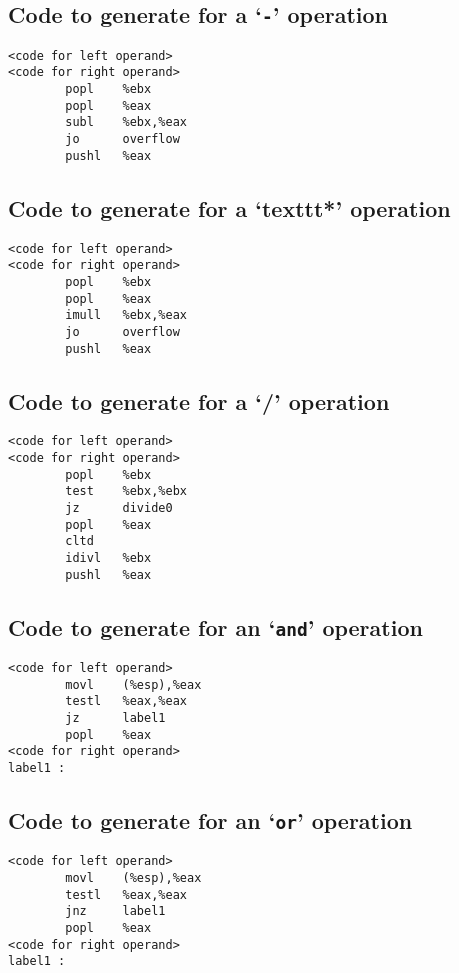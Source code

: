 \documentclass{article}
\begin{document}
\subsection*{Code to generate for a `\texttt{-}' operation}
\begin{verbatim}
<code for left operand>
<code for right operand>
        popl    %ebx
        popl    %eax
        subl    %ebx,%eax
        jo      overflow
        pushl   %eax
\end{verbatim}

\subsection*{Code to generate for a `texttt{*}' operation}
\begin{verbatim}
<code for left operand>
<code for right operand>
        popl    %ebx
        popl    %eax
        imull   %ebx,%eax
        jo      overflow
        pushl   %eax
\end{verbatim}

\subsection*{Code to generate for a `/' operation}
\begin{verbatim}
<code for left operand>
<code for right operand>
        popl    %ebx
        test    %ebx,%ebx
        jz      divide0
        popl    %eax
        cltd
        idivl   %ebx
        pushl   %eax
\end{verbatim}

\subsection*{Code to generate for an `\texttt{and}' operation}
\begin{verbatim}
<code for left operand>
        movl    (%esp),%eax
        testl   %eax,%eax
        jz      label1
        popl    %eax
<code for right operand>
label1 :
\end{verbatim}

\subsection*{Code to generate for an `\texttt{or}' operation}
\begin{verbatim}
<code for left operand>
        movl    (%esp),%eax
        testl   %eax,%eax
        jnz     label1
        popl    %eax
<code for right operand>
label1 :
\end{verbatim}
\end{document}
